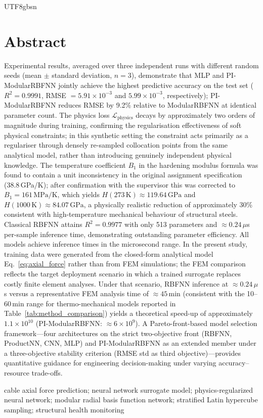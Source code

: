 \documentclass[a4paper,12pt]{report}
\newenvironment{abstracten}{%
  \chapter*{Abstract}
  \addcontentsline{toc}{chapter}{Abstract}
  \fontsize{11}{14}\selectfont\setlength{\baselineskip}{20pt}\noindent\ignorespaces
}{\par\vspace{0.5cm}}
\newcommand{\Keywords}[1]{\par\noindent{\bfseries Keywords: }#1}
\begin{document}
\begin{CJK}{UTF8}{gbsn}
\begin{abstracten}
Experimental results, averaged over three independent runs with different random seeds
(mean $\pm$ standard deviation, $n=3$), demonstrate that MLP and PI-ModularRBFNN jointly
achieve the highest predictive accuracy on the test set ($R^2 = 0.9991$,
RMSE $= 5.91\times10^{-3}$ and $5.99\times10^{-3}$, respectively); PI-ModularRBFNN
reduces RMSE by 9.2\% relative to ModularRBFNN at identical parameter count.
The physics loss $\mathcal{L}_{\text{physics}}$ decays by approximately two orders of
magnitude during training, confirming the regularisation effectiveness of soft physical
constraints; in this synthetic setting the constraint acts primarily as a regulariser
through densely re-sampled collocation points from the same analytical model, rather than
introducing genuinely independent physical knowledge.
The temperature coefficient $B_1$ in the hardening modulus formula was found to contain
a unit inconsistency in the original assignment specification (38.8\,GPa/K); after
confirmation with the supervisor this was corrected to $B_1 = 161\,\mathrm{MPa/K}$,
which yields $H(273\,\mathrm{K})\approx119.64\,\mathrm{GPa}$ and
$H(1000\,\mathrm{K})\approx84.07\,\mathrm{GPa}$, a physically realistic reduction of
approximately 30\% consistent with high-temperature mechanical behaviour of structural
steels.
Classical RBFNN attains $R^2 = 0.9977$ with only 513 parameters and
$\approx\!0.24\,\mu$s per-sample inference time, demonstrating outstanding parameter
efficiency. All models achieve inference times in the microsecond range. In the present study,
training data were generated from the closed-form analytical model Eq.~\eqref{eq:axial_force}
rather than from FEM simulations; the FEM comparison reflects the target deployment
scenario in which a trained surrogate replaces costly finite element analyses. Under that
scenario, RBFNN inference at $\approx\!0.24\,\mu$s versus a representative FEM analysis
time of $\approx\!45$\,min (consistent with the 10--60\,min range for thermo-mechanical
models reported in Table~\ref{tab:method_comparison}) yields a theoretical speed-up of
approximately $1.1\times10^{10}$
(PI-ModularRBFNN: $\approx6\times10^{9}$).
A Pareto-front-based model selection framework---four architectures on the strict
two-objective front (RBFNN, ProductNN, CNN, MLP) and PI-ModularRBFNN as an
extended member under a three-objective stability criterion (RMSE std as third
objective)---provides quantitative guidance for engineering decision-making under
varying accuracy--resource trade-offs.

\Keywords{cable axial force prediction; neural network surrogate model; physics-regularized
neural network; modular radial basis function network; stratified Latin hypercube sampling;
structural health monitoring}
\end{abstracten}


\end{CJK}
\end{document}
